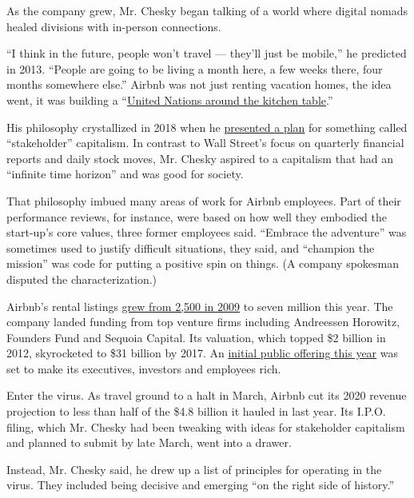 As the company grew, Mr. Chesky began talking of a world where digital
nomads healed divisions with in-person connections.

``I think in the future, people won't travel --- they'll just be
mobile,'' he predicted in 2013. ``People are going to be living a month
here, a few weeks there, four months somewhere else.'' Airbnb was not
just renting vacation homes, the idea went, it was building a
``\href{https://slate.com/business/2014/02/airbnb-gentrification-how-the-sharing-economy-drives-up-housing-prices.html}{United
Nations around the kitchen table}.''

His philosophy crystallized in 2018 when he
\href{https://news.airbnb.com/brian-cheskys-open-letter-to-the-airbnb-community-about-building-a-21st-century-company/}{presented
a plan} for something called ``stakeholder'' capitalism. In contrast to
Wall Street's focus on quarterly financial reports and daily stock
moves, Mr. Chesky aspired to a capitalism that had an ``infinite time
horizon'' and was good for society.

That philosophy imbued many areas of work for Airbnb employees. Part of
their performance reviews, for instance, were based on how well they
embodied the start-up's core values, three former employees said.
``Embrace the adventure'' was sometimes used to justify difficult
situations, they said, and ``champion the mission'' was code for putting
a positive spin on things. (A company spokesman disputed the
characterization.)

Airbnb's rental listings
\href{https://press.airbnb.com/wp-content/uploads/sites/4/2018/08/The-Airbnb-Story-Timeline-EN-GLOBAL.pdf}{grew
from 2,500 in 2009} to seven million this year. The company landed
funding from top venture firms including Andreessen Horowitz, Founders
Fund and Sequoia Capital. Its valuation, which topped \$2 billion in
2012, skyrocketed to \$31 billion by 2017. An
\href{https://www.nytimes.com/2019/09/20/technology/airbnb-employees-ipo-payouts.html}{initial
public offering this year} was set to make its executives, investors and
employees rich.

Enter the virus. As travel ground to a halt in March, Airbnb cut its
2020 revenue projection to less than half of the \$4.8 billion it hauled
in last year. Its I.P.O. filing, which Mr. Chesky had been tweaking with
ideas for stakeholder capitalism and planned to submit by late March,
went into a drawer.

Instead, Mr. Chesky said, he drew up a list of principles for operating
in the virus. They included being decisive and emerging ``on the right
side of history.''

